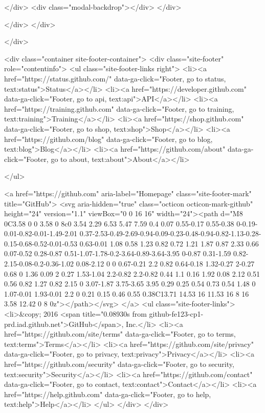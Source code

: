   </div>
  <div class="modal-backdrop"></div>
</div>


    </div>
  </div>

    </div>

        <div class="container site-footer-container">
  <div class="site-footer" role="contentinfo">
    <ul class="site-footer-links right">
        <li><a href="https://status.github.com/" data-ga-click="Footer, go to status, text:status">Status</a></li>
      <li><a href="https://developer.github.com" data-ga-click="Footer, go to api, text:api">API</a></li>
      <li><a href="https://training.github.com" data-ga-click="Footer, go to training, text:training">Training</a></li>
      <li><a href="https://shop.github.com" data-ga-click="Footer, go to shop, text:shop">Shop</a></li>
        <li><a href="https://github.com/blog" data-ga-click="Footer, go to blog, text:blog">Blog</a></li>
        <li><a href="https://github.com/about" data-ga-click="Footer, go to about, text:about">About</a></li>

    </ul>

    <a href="https://github.com" aria-label="Homepage" class="site-footer-mark" title="GitHub">
      <svg aria-hidden="true" class="octicon octicon-mark-github" height="24" version="1.1" viewBox="0 0 16 16" width="24"><path d="M8 0C3.58 0 0 3.58 0 8c0 3.54 2.29 6.53 5.47 7.59 0.4 0.07 0.55-0.17 0.55-0.38 0-0.19-0.01-0.82-0.01-1.49-2.01 0.37-2.53-0.49-2.69-0.94-0.09-0.23-0.48-0.94-0.82-1.13-0.28-0.15-0.68-0.52-0.01-0.53 0.63-0.01 1.08 0.58 1.23 0.82 0.72 1.21 1.87 0.87 2.33 0.66 0.07-0.52 0.28-0.87 0.51-1.07-1.78-0.2-3.64-0.89-3.64-3.95 0-0.87 0.31-1.59 0.82-2.15-0.08-0.2-0.36-1.02 0.08-2.12 0 0 0.67-0.21 2.2 0.82 0.64-0.18 1.32-0.27 2-0.27 0.68 0 1.36 0.09 2 0.27 1.53-1.04 2.2-0.82 2.2-0.82 0.44 1.1 0.16 1.92 0.08 2.12 0.51 0.56 0.82 1.27 0.82 2.15 0 3.07-1.87 3.75-3.65 3.95 0.29 0.25 0.54 0.73 0.54 1.48 0 1.07-0.01 1.93-0.01 2.2 0 0.21 0.15 0.46 0.55 0.38C13.71 14.53 16 11.53 16 8 16 3.58 12.42 0 8 0z"></path></svg>
</a>
    <ul class="site-footer-links">
      <li>&copy; 2016 <span title="0.08930s from github-fe123-cp1-prd.iad.github.net">GitHub</span>, Inc.</li>
        <li><a href="https://github.com/site/terms" data-ga-click="Footer, go to terms, text:terms">Terms</a></li>
        <li><a href="https://github.com/site/privacy" data-ga-click="Footer, go to privacy, text:privacy">Privacy</a></li>
        <li><a href="https://github.com/security" data-ga-click="Footer, go to security, text:security">Security</a></li>
        <li><a href="https://github.com/contact" data-ga-click="Footer, go to contact, text:contact">Contact</a></li>
        <li><a href="https://help.github.com" data-ga-click="Footer, go to help, text:help">Help</a></li>
    </ul>
  </div>
</div>




